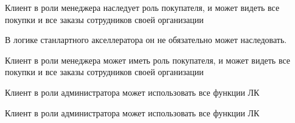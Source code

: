{


\begin{wiki}
Клиент в роли менеджера наследует роль покупателя, и может видеть все покупки и все заказы сотрудников своей организации
\end{wiki}

\begin{teamidea}
В логике станлартного акселлератора он не обязательно может наследовать.
\end{teamidea}


\begin{itogo}
Клиент в роли менеджера может иметь роль покупателя, и может видеть все покупки и все заказы сотрудников своей организации
\end{itogo}
}



{

\begin{wiki}
Клиент в роли администратора может использовать все функции ЛК
\end{wiki}


\begin{itogo}
Клиент в роли администратора может использовать все функции ЛК
\end{itogo}
}


